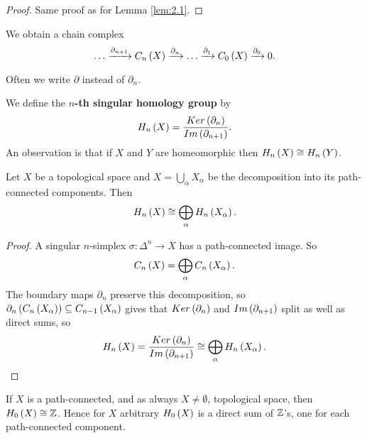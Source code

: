 \begin{proof}
Same proof as for Lemma \ref{lem:2.1}.
\end{proof}

We obtain a chain complex
$$ \dots \xrightarrow{\partial_{n + 1}} C_n\left( X \right) \xrightarrow{\partial_n} \dots \xrightarrow{\partial_1} C_0\left( X \right) \xrightarrow{\partial_0} 0. $$

\begin{remark*}
Often we write $ \partial $ instead of $ \partial_n $.
\end{remark*}

We define the \textbf{$ n $-th singular homology group} by
$$ H_n\left( X \right) = \dfrac{Ker\left( \partial_n \right)}{Im\left( \partial_{n + 1} \right)}. $$
An observation is that if $ X $ and $ Y $ are homeomorphic then $ H_n\left( X \right) \cong H_n\left( Y \right) $.

\begin{proposition}
Let $ X $ be a topological space and $ X = \bigcup_\alpha X_\alpha $ be the decomposition into its path-connected components. Then
$$ H_n\left( X \right) \cong \bigoplus_\alpha H_n\left( X_\alpha \right). $$
\end{proposition}

\begin{proof}
A singular $ n $-simplex $ \sigma : \Delta^n \to X $ has a path-connected image. So
$$ C_n\left( X \right) = \bigoplus_\alpha C_n\left( X_\alpha \right). $$
The boundary maps $ \partial_n $ preserve this decomposition, so $ \partial_n\left( C_n\left( X_\alpha \right) \right) \subseteq C_{n - 1}\left( X_\alpha \right) $ gives that $ Ker\left( \partial_n \right) $ and $ Im\left( \partial_{n + 1} \right) $ split as well as direct sums, so
$$ H_n\left( X \right) = \dfrac{Ker\left( \partial_n \right)}{Im\left( \partial_{n + 1} \right)} \cong \bigoplus_\alpha H_n\left( X_\alpha \right). $$
\end{proof}

\begin{proposition}
\label{prop:2.7}
If $ X $ is a path-connected, and as always $ X \ne \emptyset $, topological space, then $ H_0\left( X \right) \cong \mathbb{Z} $. Hence for $ X $ arbitrary $ H_0\left( X \right) $ is a direct sum of $ \mathbb{Z} $'s, one for each path-connected component.
\end{proposition}


